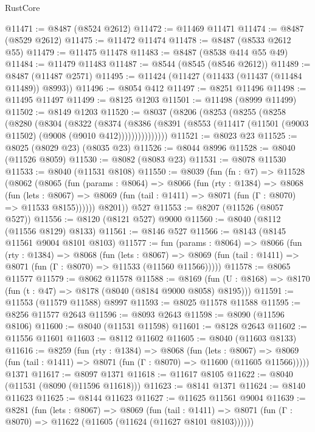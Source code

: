 \begin{lexlean}{RustCore}
\begin{coremodule}
@11471 := @8487 (@8524 @2612)
@11472 := @11469 @11471
@11474 := @8487 (@8529 @2612)
@11475 := @11472 @11474
@11478 := @8487 (@8533 @2612 @55)
@11479 := @11475 @11478
@11483 := @8487 (@8538 @414 @55 @49)
@11484 := @11479 @11483
@11487 := @8544 (@8545 (@8546 @2612))
@11489 := @8487 (@11487 @2571)
@11495 := @11424 (@11427 (@11433 (@11437 (@11484 @11489)) @8993))
@11496 := @8054 @412
@11497 := @8251 @11496
@11498 := @11495 @11497
@11499 := @8125 @1203
@11501 := @11498 (@8999 @11499)
@11502 := @8149 @1203
@11520 := @8037
    (@8206
      (@8253
        (@8255
          (@8258
            (@8280
              (@8304
                (@8322
                  (@8374
                    (@8386
                      (@8391 (@8553 (@11417 (@11501 (@9003 @11502) (@9008 (@9010 @412)))))))))))))))
@11521 := @8023 @23
@11525 := @8025 (@8029 @23) (@8035 @23)
@11526 := @8044 @8996
@11528 := @8040 (@11526 @8059)
@11530 := @8082 (@8083 @23)
@11531 := @8078 @11530
@11533 := @8040 (@11531 @8108)
@11550 := @8039
    (fun (fn : @7) =>
    @11528
      (@8062
        (@8065
          (fun (params : @8064) =>
          @8066
            (fun (rty : @1384) =>
            @8068
              (fun (lets : @8067) =>
              @8069 (fun (tail : @1411) => @8071 (fun (Γ : @8070) => @11533 @8155))))))
        @8201))
    @527
@11553 := @8207 (@11526 (@8057 @527))
@11556 := @8120 (@8121 @527) @9000
@11560 := @8040 (@8112 (@11556 @8129) @8133)
@11561 := @8146 @527
@11566 := @8143 (@8145 @11561 @9004 @8101 @8103)
@11577 := fun (params : @8064) =>
  @8066
    (fun (rty : @1384) =>
    @8068
      (fun (lets : @8067) =>
      @8069 (fun (tail : @1411) => @8071 (fun (Γ : @8070) => @11533 (@11560 @11566)))))
@11578 := @8065 @11577
@11579 := @8062 @11578
@11588 := @8169
    (fun (U : @8168) => @8170 (fun (t : @47) => @8178 (@8040 (@8184 @9000 @8058) @8195)))
@11591 := @11553 (@11579 @11588) @8997
@11593 := @8025 @11578 @11588
@11595 := @8256 @11577 @2643
@11596 := @8093 @2643
@11598 := @8090 (@11596 @8106)
@11600 := @8040 (@11531 @11598)
@11601 := @8128 @2643
@11602 := @11556 @11601
@11603 := @8112 @11602
@11605 := @8040 (@11603 @8133)
@11616 := @8259
    (fun (rty : @1384) =>
    @8068
      (fun (lets : @8067) =>
      @8069 (fun (tail : @1411) => @8071 (fun (Γ : @8070) => @11600 (@11605 @11566)))))
    @1371
@11617 := @8097 @1371
@11618 := @11617 @8105
@11622 := @8040 (@11531 (@8090 (@11596 @11618)))
@11623 := @8141 @1371
@11624 := @8140 @11623
@11625 := @8144 @11623
@11627 := @11625 @11561 @9004
@11639 := @8281
    (fun (lets : @8067) =>
    @8069
      (fun (tail : @1411) =>
      @8071 (fun (Γ : @8070) => @11622 (@11605 (@11624 (@11627 @8101 @8103))))))

\end{coremodule}
\end{lexlean}
